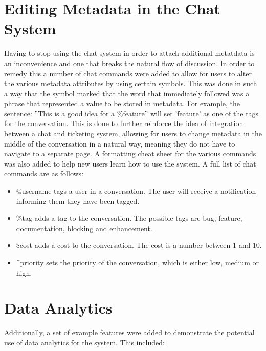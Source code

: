 \documentclass{l4proj}
\begin{document}
\section{Editing Metadata in the Chat System}

Having to stop using the chat system in order to attach additional metatdata is an inconvenience and one that breaks the natural flow of discussion.  In order to remedy this a number of chat commands were added to allow for users to alter the various metadata attributes by using certain symbols. This was done in such a way that the symbol marked that the word that immediately followed was a phrase that represented a value to be stored in metadata. For example, the sentence:
\newline
\newline
''This is a good idea for a \%feature''
\newline
\newline
will set 'feature' as one of the tags for the conversation.  This is done to further reinforce the idea of integration between a chat and ticketing system, allowing for users to change metadata in the middle of the conversation in a natural way, meaning they do not have to navigate to a separate page.  A formatting cheat sheet for the various commands was also added to help new users learn how to use the system.  A full list of chat commands are as follows:

\begin{itemize}
\item @username tags a user in a conversation.  The user will receive a notification informing them they have been tagged.
\item \%tag adds a tag to the conversation.  The possible tags are bug, feature, documentation, blocking and enhancement.
\item \$cost adds a cost to the conversation.  The cost is a number between 1 and 10.
\item \textasciicircum priority sets the priority of the conversation, which is either low, medium or high.
\end{itemize}

\newpage

\section{Data Analytics}
Additionally, a set of example features were added to demonstrate the potential use of data analytics for the system.  This included:
\end{document}
